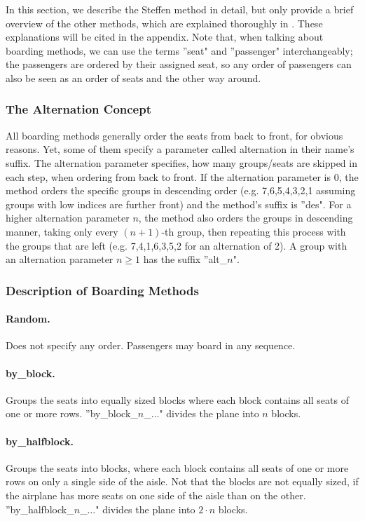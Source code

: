 \documentclass[11pt]{article}
\begin{document}
In this section, we describe the Steffen method in detail, but only provide a brief overview of the other methods, which are explained thoroughly in \cite{beus}. These explanations will be cited in the appendix. Note that, when talking about boarding methods, we can use the terms ''seat" and ''passenger" interchangeably; the passengers are ordered by their assigned seat, so any order of passengers can also be seen as an order of seats and the other way around.


\subsubsection{The Alternation Concept}

All boarding methods generally order the seats from back to front, for obvious reasons. Yet, some of them specify a parameter called alternation in their name's suffix. The alternation parameter specifies, how many groups/seats are skipped in each step, when ordering from back to front. If the alternation parameter is 0, the method orders the specific groups in descending order (e.g. 7,6,5,4,3,2,1 assuming groups with low indices are further front) and the method's suffix is ''des". For a higher alternation parameter $n$, the method also orders the groups in descending manner, taking only every $(n+1)$-th group, then repeating this process with the groups that are left (e.g. 7,4,1,6,3,5,2 for an alternation of 2). A group with an alternation parameter $n \geq 1$ has the suffix ''alt\_$n$".



\subsubsection{Description of Boarding Methods}

\paragraph{Random.} Does not specify any order. Passengers may board in any sequence.
\paragraph{by\_block.} Groups the seats into equally sized blocks where each block contains all seats of one or more rows. ''by\_block\_$n$\_$\dots$" 
divides the plane into $n$ blocks.
\paragraph{by\_halfblock.} Groups the seats into blocks, where each block contains all seats of one or more rows on only a single side of the aisle. Not that the blocks are not equally sized, if the airplane has more seats on one side of the aisle than on the other. ''by\_halfblock\_$n$\_$\dots$" divides the plane into $2\cdot n$ blocks.
\end{document}
